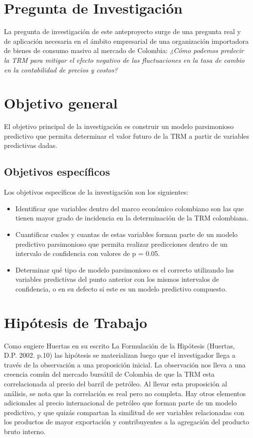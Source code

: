 \documentclass[letterpaper, spanish, 11pt]{report}
\begin{document}
\section{Pregunta de Investigación}
La pregunta de investigación de este anteproyecto surge de una pregunta real y de aplicación necesaria en el ámbito empresarial de una organización importadora de bienes de consumo masivo al mercado de Colombia: \emph{¿Cómo podemos predecir la TRM para mitigar el efecto negativo de las fluctuaciones en la tasa de cambio en la contabilidad de precios y costos?}

\section{Objetivo general}
El objetivo principal de la investigación es construir un modelo parsimonioso predictivo que permita determinar el valor futuro de la TRM a partir de variables predictivas dadas.

\subsection{Objetivos específicos}
Los objetivos específicos de la investigación son los siguientes:

\begin{itemize}
	\item Identificar que variables dentro del marco económico colombiano son las que tienen mayor grado de incidencia en la determinación de la TRM colombiana. 
	\item Cuantificar cuales y cuantas de estas variables forman parte de un modelo predictivo parsimonioso que permita realizar predicciones dentro de un intervalo de confidencia con valores de p = 0.05. 
	\item Determinar qué tipo de modelo parsimonioso es el correcto utilizando las variables predictivas del punto anterior con los mismos intervalos de confidencia, o en su defecto si este es un modelo predictivo compuesto. 
\end{itemize}

\section{Hipótesis de Trabajo }
Como sugiere Huertas en su escrito La Formulación de la Hipótesis (Huertas, D.P. 2002. p.10) las hipótesis se materializan luego que el investigador llega a través de la observación a una proposición inicial. La observación nos lleva a una creencia común del mercado bursátil de Colombia de que la TRM esta correlacionada al precio del barril de petróleo. Al llevar esta proposición al análisis, se nota que la correlación es real pero no completa. Hay otros elementos adicionales al precio internacional de petróleo que forman parte de un modelo predictivo, y que quizás compartan la similitud de ser variables relacionadas con los productos de mayor exportación y contribuyentes a la agregación del producto bruto interno.
\end{document}
